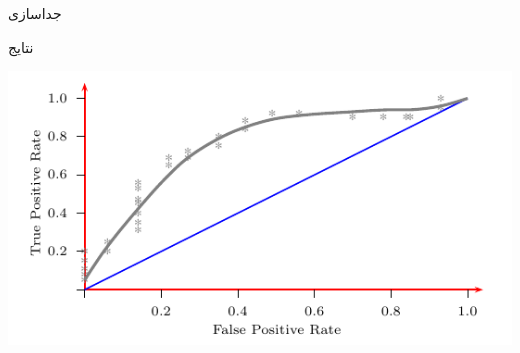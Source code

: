 \documentclass[debug,a0paper,portrait,persian]{xebaposter}
\begin{document}
\begin{poster}
\begin{posterbox}[name=phase4,column=2,span=1,below=phase3]{جداسازی}
\ptext[6]
\end{posterbox}
\begin{posterbox}[name=results,column=1,span=2,below=phase2]{نتایج}
\begin{multicols}{2}
    \centerline{\includegraphics[scale=.7]{fig6}}
    \ptext[2-3]
    

\end{multicols}
\end{posterbox}
\end{poster}
\end{document}
